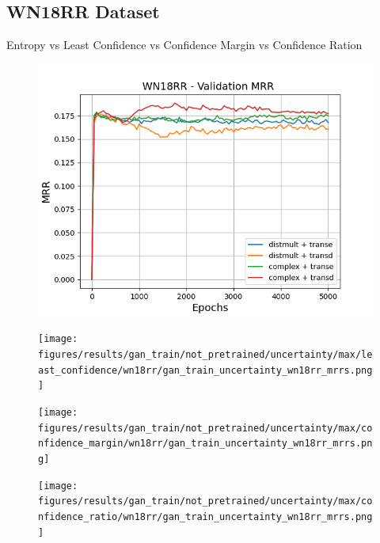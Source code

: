 \subsection{WN18RR Dataset}

Entropy 
vs 
Least Confidence 
vs 
Confidence Margin 
vs 
Confidence Ration

\begin{figure}
    \centering
    \begin{minipage}{.5\textwidth}
      \centering
      \includegraphics[width=0.9\linewidth]{figures/results/gan_train/not_pretrained/uncertainty/max/entropy/wn18rr/gan_train_uncertainty_wn18rr_mrrs.png}
    \end{minipage}%
    \begin{minipage}{.5\textwidth}
      \centering
      \texttt{[image: figures/results/gan\_train/not\_pretrained/uncertainty/max/least\_confidence/wn18rr/gan\_train\_uncertainty\_wn18rr\_mrrs.png]}
    \end{minipage}
    \begin{minipage}{.5\textwidth}
      \centering
      \texttt{[image: figures/results/gan\_train/not\_pretrained/uncertainty/max/confidence\_margin/wn18rr/gan\_train\_uncertainty\_wn18rr\_mrrs.png]}
    \end{minipage}%
    \begin{minipage}{.5\textwidth}
      \centering
      \texttt{[image: figures/results/gan\_train/not\_pretrained/uncertainty/max/confidence\_ratio/wn18rr/gan\_train\_uncertainty\_wn18rr\_mrrs.png]}
    \end{minipage}%
    \caption{}
    \label{fig:advtrain_metrics_wn18rr}
\end{figure}


